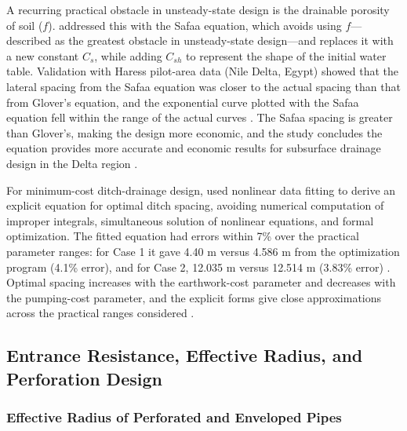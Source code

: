 \documentclass[11pt]{article}
\begin{document}
A recurring practical obstacle in unsteady-state design is the drainable porosity of soil
($f$). \textcite{FathAllah2025} addressed this with the Safaa equation, which avoids using
$f$---described as the greatest obstacle in unsteady-state design---and replaces it with a
new constant $C_s$, while adding $C_{sh}$ to represent the shape of the initial water
table. Validation with Haress pilot-area data (Nile Delta, Egypt) showed that the lateral
spacing from the Safaa equation was closer to the actual spacing than that from Glover's
equation, and the exponential curve plotted with the Safaa equation fell within the range
of the actual curves \parencite{FathAllah2025}. The Safaa spacing is greater than
Glover's, making the design more economic, and the study concludes the equation provides
more accurate and economic results for subsurface drainage design in the Delta region
\parencite{FathAllah2025}.

For minimum-cost ditch-drainage design, \textcite{Chahar2010} used nonlinear data fitting
to derive an explicit equation for optimal ditch spacing, avoiding numerical computation
of improper integrals, simultaneous solution of nonlinear equations, and formal
optimization. The fitted equation had errors within 7\% over the practical parameter
ranges: for Case 1 it gave 4.40 m versus 4.586 m from the optimization program (4.1\%
error), and for Case 2, 12.035 m versus 12.514 m (3.83\% error) \parencite{Chahar2010}.
Optimal spacing increases with the earthwork-cost parameter and decreases with the
pumping-cost parameter, and the explicit forms give close approximations across the
practical ranges considered \parencite{Chahar2010}.

\subsection{Entrance Resistance, Effective Radius, and Perforation Design}

\subsubsection{Effective Radius of Perforated and Enveloped Pipes}
\end{document}
